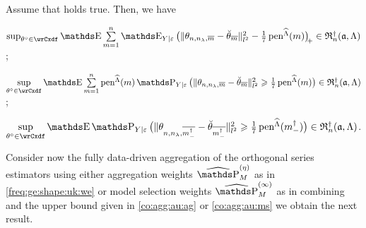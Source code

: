 \begin{lm}\label{freq:ge:strat:uk:ma:as}
Assume that  holds true.
Then, we have
\begin{resListeN}
\item\label{freq:ge:strat:uk:ma:as1}
$\sup_{\xdf\in\rwCxdf}\E\sum\limits_{\Di=1}^{\ssY}\E_{\rY \vert \rE}\vectp{\Vnormlp{\hxdfPr-\dxdfPr}^2-\tfrac{1}{7}\peneSv} \in \naRa{(\xdfCw[],\Lambda)}$;
\item\label{freq:ge:strat:uk:ma:as2}
  $\sup\limits_{\xdf\in\rwCxdf}\E\sum\limits_{\Di=1}^{\ssY}\peneSv\P_{\rY \vert \rE}\big(\Vnormlp{\hxdfPr-\dxdfPr}^2\geq\tfrac{1}{7}\peneSv\big) \in \naRa{(\xdfCw[],\Lambda)}$;
\item\label{freq:ge:strat:uk:ma:as3}
  $\sup\limits_{\xdf\in\rwCxdf}\E\P_{\rY \vert \rE}\big(\Vnormlp{\hxdfPr[\mdDi]-\dxdfPr[\mdDi]}^2\geq\tfrac{1}{7}\peneSv[(\mdDi)]\big) \in \naRa{(\xdfCw[],\Lambda)}$.
\end{resListeN}
\reEnd
\end{lm}
\begin{te}Consider now the fully data-driven aggregation of the
  orthogonal series estimators using either  aggregation weights $\erWe[]$
  as in \eqref{freq:ge:shape:uk:we} or model selection weights $\widehat{\P}_{M}^{(\infty)}$ as in 
  combining  and the upper bound given
  in \eqref{co:agg:au:ag}  or \eqref{co:agg:au:ms} we obtain the next result. 
\end{te}
